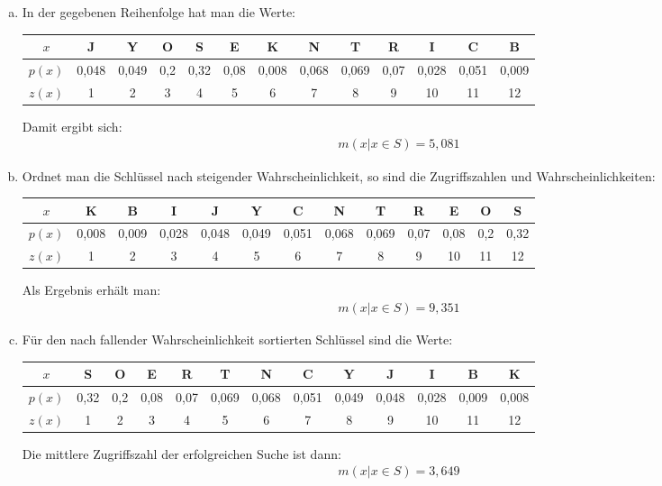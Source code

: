 \documentclass[11pt]{article}
\begin{document}
  \begin{enumerate}[a)]
    \item 
      In der gegebenen Reihenfolge hat man die Werte:
      \begin{table}[h!]
        \centering
        \begin{tabular}{|c|c|c|c|c|c|c|c|c|c|c|c|c|}
        \hline 
        $x$ & J & Y & O & S & E & K & N & T & R & I & C & B \\ 
        \hline 
        $p(x)$ & 0,048 & 0,049 & 0,2 & 0,32 & 0,08 & 0,008 & 0,068 & 0,069 &
          0,07 & 0,028 & 0,051 & 0,009 \\ 
        \hline 
        $z(x)$ & 1 & 2 & 3 & 4 & 5 & 6 & 7 & 8 & 9 & 10 & 11 & 12 \\ 
        \hline 
        \end{tabular} 
      \end{table}
      
      Damit ergibt sich:
      \begin{align*}
        m(x \vert x \in S) = 5,081
      \end{align*}
    \item 
      Ordnet man die Schlüssel nach steigender Wahrscheinlichkeit, so sind die
      Zugriffszahlen und Wahrscheinlichkeiten:
      \begin{table}[h!]
        \centering
        \begin{tabular}{|c|c|c|c|c|c|c|c|c|c|c|c|c|}
        \hline 
        $x$ & K & B & I & J & Y & C & N & T & R & E & O & S \\ 
        \hline 
        $p(x)$ & 0,008 & 0,009 & 0,028 & 0,048 & 0,049 & 0,051 & 0,068 & 0,069 &
          0,07 & 0,08 & 0,2 & 0,32 \\ 
        \hline 
        $z(x)$ & 1 & 2 & 3 & 4 & 5 & 6 & 7 & 8 & 9 & 10 & 11 & 12 \\ 
        \hline 
        \end{tabular} 
      \end{table}
      
      Als Ergebnis erhält man:
      \begin{align*}
        m(x \vert x \in S) = 9,351
      \end{align*}
  \newpage
    \item 
      Für den nach fallender Wahrscheinlichkeit sortierten Schlüssel sind die
      Werte:
      \begin{table}[h!]
        \centering
        \begin{tabular}{|c|c|c|c|c|c|c|c|c|c|c|c|c|}
        \hline 
        $x$ & S & O & E & R & T & N & C & Y & J & I & B & K \\ 
        \hline 
        $p(x)$ & 0,32 & 0,2 & 0,08 & 0,07 & 0,069 & 0,068 & 0,051 & 0,049 &
          0,048 & 0,028 & 0,009 & 0,008 \\ 
        \hline 
        $z(x)$ & 1 & 2 & 3 & 4 & 5 & 6 & 7 & 8 & 9 & 10 & 11 & 12 \\ 
        \hline 
        \end{tabular} 
      \end{table}
      
      Die mittlere Zugriffszahl der erfolgreichen Suche ist dann:
      \begin{align*}
        m(x \vert x \in S) = 3,649
      \end{align*}
  \end{enumerate}
\end{document}
